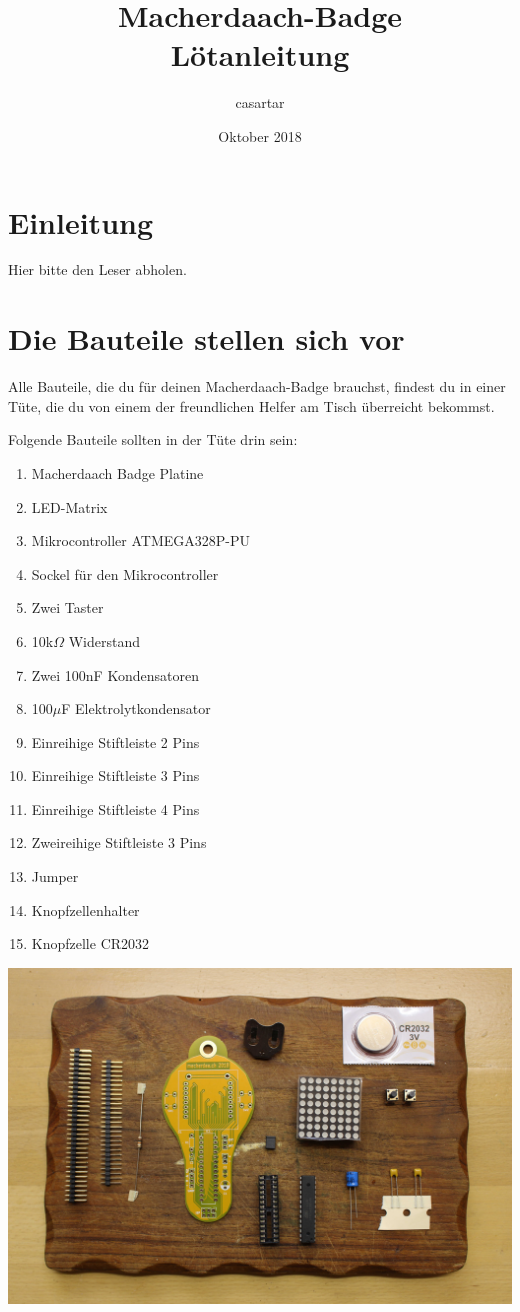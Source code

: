 \documentclass{article}
\title{Macherdaach-Badge \\ Lötanleitung}
\date{Oktober 2018}
\author{casartar}
\begin{document}
\maketitle
\section{Einleitung}

Hier bitte den Leser abholen.

\section{Die Bauteile stellen sich vor}
Alle Bauteile, die du für deinen Macherdaach-Badge brauchst, findest du in einer Tüte, die du von einem der freundlichen Helfer  am Tisch überreicht bekommst.

Folgende Bauteile sollten in der Tüte drin sein:

\begin{enumerate}
	\item Macherdaach Badge Platine
	\item LED-Matrix
	\item Mikrocontroller ATMEGA328P-PU
	\item Sockel für den Mikrocontroller
	\item Zwei Taster
	\item 10k$\Omega$ Widerstand
	\item Zwei 100nF Kondensatoren
	\item 100$\mu$F Elektrolytkondensator
	\item Einreihige Stiftleiste 2 Pins
	\item Einreihige Stiftleiste 3 Pins
	\item Einreihige Stiftleiste 4 Pins
	\item Zweireihige Stiftleiste 3 Pins
	\item Jumper
	\item Knopfzellenhalter
	\item Knopfzelle CR2032
\end{enumerate}



\begin{center}
\includegraphics[width=\textwidth]{Bilder/IMG_5537.JPG}
\label{fig:all_components}
\end{center}
\end{document}
